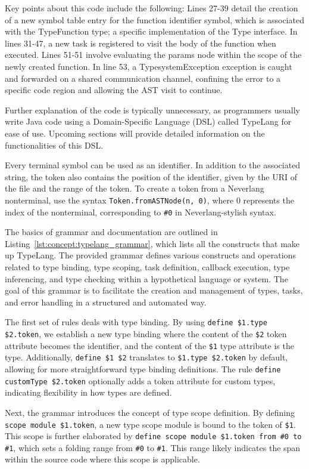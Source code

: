 Key points about this code include the following: Lines 27-39 detail the creation of a new symbol table entry for the function identifier symbol, which is associated with the TypeFunction type; a specific implementation of the Type interface. In lines 31-47, a new task is registered to visit the body of the function when executed. Lines 51-51 involve evaluating the params node within the scope of the newly created function. In line 53, a TypesystemException exception is caught and forwarded on a shared communication channel, confining the error to a specific code region and allowing the AST visit to continue.

Further explanation of the code is typically unnecessary, as programmers usually write Java code using a Domain-Specific Language (DSL) called TypeLang for ease of use. Upcoming sections will provide detailed information on the functionalities of this DSL.


Every terminal symbol can be used as an identifier. In addition to the associated string, the token also contains the position of the identifier, given by the URI of the file and the range of the token. To create a token from a Neverlang nonterminal, use the syntax \texttt{Token.fromASTNode(n, 0)}, where 0 represents the index of the nonterminal, corresponding to \texttt{\#0} in Neverlang-stylish syntax.

The basics of grammar and documentation are outlined in Listing~\ref{lst:concept:typelang_grammar}, which lists all the constructs that make up TypeLang.
The provided grammar defines various constructs and operations related to type binding, type scoping, task definition, callback execution, type inferencing, and type checking within a hypothetical language or system. The goal of this grammar is to facilitate the creation and management of types, tasks, and error handling in a structured and automated way.

The first set of rules deals with type binding. By using \texttt{define \$1.type \$2.token}, we establish a new type binding where the content of the \texttt{\$2} token attribute becomes the identifier, and the content of the \texttt{\$1} type attribute is the type. Additionally, \texttt{define \$1 \$2} translates to \texttt{\$1.type \$2.token} by default, allowing for more straightforward type binding definitions. The rule \texttt{define customType \$2.token} optionally adds a token attribute for custom types, indicating flexibility in how types are defined.

Next, the grammar introduces the concept of type scope definition. By defining \texttt{scope module \$1.token}, a new type scope module is bound to the token of \texttt{\$1}. This scope is further elaborated by \texttt{define scope module \$1.token from \#0 to \#1}, which sets a folding range from \texttt{\#0} to \texttt{\#1}. This range likely indicates the span within the source code where this scope is applicable.

